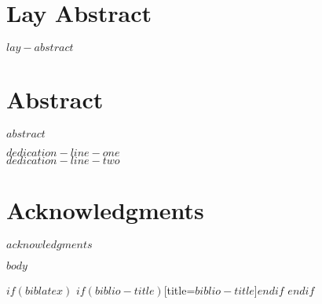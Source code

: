 \documentclass[
$if(fontsize)$
	$fontsize$,
$endif$
$if(lang)$
	$babel-lang$,
$endif$
$if(papersize)$
	$papersize$paper,
$endif$
$if(beamer)$
	ignorenonframetext,
$if(handout)$
	handout,
$endif$
$if(aspectratio)$
	aspectratio=$aspectratio$,
$endif$
$endif$
$for(classoption)$
	$classoption$$sep$,
$endfor$
]{$documentclass$}
\begin{document}
\chapter{Lay Abstract}
$lay-abstract$

\chapter{Abstract}
$abstract$

\newpage
\null\vfill
\begin{center}
\textsl{$dedication-line-one$ \\ $dedication-line-two$}
\end{center}
\vfill
	
\chapter{Acknowledgments}
$acknowledgments$
\newpage

\tableofcontents

\newpage
\addvspace{10pt}
\let\saveaddvspace=\addvspace
\def\addvspace#1{}
\listoffigures
\let\addvspace=\saveaddvspace

\newpage
\addvspace{10pt}
\let\saveaddvspace=\addvspace
\def\addvspace#1{}
\listoftables
\let\addvspace=\saveaddvspace
\label{NumPrefacePages}
\newpage

\hypersetup{pageanchor=true}


$body$

\begin{appendix}
\end{appendix}

$if(biblatex)$
\printbibliography$if(biblio-title)$[title=$biblio-title$]$endif$
$endif$

\label{NumDocumentPages}
\end{document}
